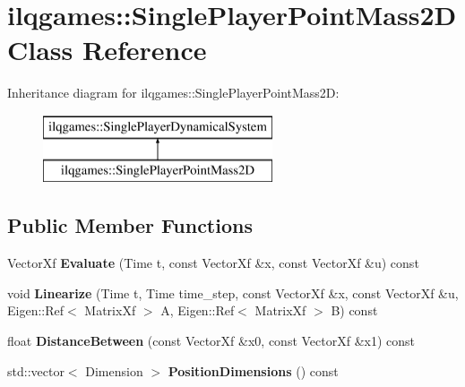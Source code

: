 \hypertarget{classilqgames_1_1_single_player_point_mass2_d}{}\section{ilqgames\+:\+:Single\+Player\+Point\+Mass2D Class Reference}
\label{classilqgames_1_1_single_player_point_mass2_d}
Inheritance diagram for ilqgames\+:\+:Single\+Player\+Point\+Mass2D\+:\begin{figure}[H]
\begin{center}
\leavevmode
\includegraphics[height=2.000000cm]{classilqgames_1_1_single_player_point_mass2_d}
\end{center}
\end{figure}
\subsection*{Public Member Functions}
\begin{DoxyCompactItemize}
\item 
Vector\+Xf {\bfseries Evaluate} (Time t, const Vector\+Xf \&x, const Vector\+Xf \&u) const \hypertarget{classilqgames_1_1_single_player_point_mass2_d_ac0bc5a89ee9b979a3f67d526c076e169}{}\label{classilqgames_1_1_single_player_point_mass2_d_ac0bc5a89ee9b979a3f67d526c076e169}

\item 
void {\bfseries Linearize} (Time t, Time time\+\_\+step, const Vector\+Xf \&x, const Vector\+Xf \&u, Eigen\+::\+Ref$<$ Matrix\+Xf $>$ A, Eigen\+::\+Ref$<$ Matrix\+Xf $>$ B) const \hypertarget{classilqgames_1_1_single_player_point_mass2_d_ab9f9495da0ac315fd04ddbe40f855269}{}\label{classilqgames_1_1_single_player_point_mass2_d_ab9f9495da0ac315fd04ddbe40f855269}

\item 
float {\bfseries Distance\+Between} (const Vector\+Xf \&x0, const Vector\+Xf \&x1) const \hypertarget{classilqgames_1_1_single_player_point_mass2_d_ae6bafe2404f528a7490be8a7c567b086}{}\label{classilqgames_1_1_single_player_point_mass2_d_ae6bafe2404f528a7490be8a7c567b086}

\item 
std\+::vector$<$ Dimension $>$ {\bfseries Position\+Dimensions} () const \hypertarget{classilqgames_1_1_single_player_point_mass2_d_a10dfba099f8cde9f4c0557abead8829d}{}\label{classilqgames_1_1_single_player_point_mass2_d_a10dfba099f8cde9f4c0557abead8829d}

\end{DoxyCompactItemize}
